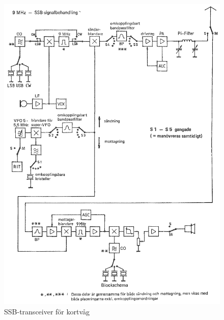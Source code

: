 \begin{figure}
  \includegraphics[width=\textwidth]{images/cropped_pdfs/bild_2_5-14.pdf}
  \caption{SSB-transceiver för kortvåg}
  \label{fig:bildII5-14}
\end{figure}

